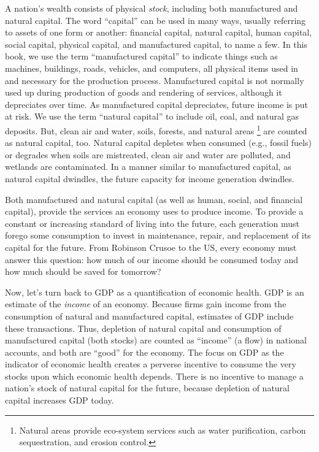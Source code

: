A nation's wealth consists of physical \emph{stock},  
including both manufactured and natural capital. 
The word ``capital'' can be used in many ways, usually referring to assets
of one form or another: 
financial capital, 
natural capital, 
human capital, 
social capital,
physical capital, and
manufactured capital, 
to name a few.
In this book, 
we use the term ``manufactured capital'' 
to indicate things such as
machines, 
buildings, 
roads,
vehicles, and
computers,
all physical items used in and necessary for the production process.
Manufactured capital is not normally used up during production 
of goods and rendering of services, 
although it depreciates over time.
As manufactured capital depreciates, future income is put at risk.
We use the term ``natural capital'' to include oil, coal, and natural gas deposits.
But, clean air and water, soils, forests, and natural areas%
	\footnote{
	Natural areas provide eco-system services such as 
	water purification, 
	carbon sequestration, 
	and erosion control.
	}
are counted as natural capital, too.
Natural capital depletes when consumed (e.g., fossil fuels)
or degrades when 
soils are mistreated, 
clean air and water are polluted, 
and wetlands are contaminated. 
In a manner similar to manufactured capital, 
as natural capital dwindles, the future
capacity for income generation dwindles. 

Both manufactured and natural capital
(as well as human, social, and financial capital), 
provide the services an economy uses to produce income. 
To provide a constant or increasing
standard of living into the future, each generation must
forego some consumption to 
invest in maintenance, repair, and
replacement of its capital for the future. 
From Robinson Crusoe to the US, 
every economy must answer this question: 
how much of our income should be consumed today and how much should be saved
for tomorrow?

Now, let's turn back to GDP as a quantification of economic health.
GDP is an estimate of the \emph{income} of an economy.
Because firms gain income from the 
consumption of  
natural and manufactured capital,
estimates of GDP include these transactions.
Thus, depletion of natural capital and
consumption of manufactured capital (both stocks) 
are counted as ``income'' (a flow) in national accounts,
and both are ``good'' for the economy.
The focus on GDP as the indicator of economic health
creates a perverse incentive to consume the very stocks upon which
economic health depends. 
There is no incentive to manage 
a nation's stock of natural capital for the future, 
because depletion of natural capital increases
GDP today.

